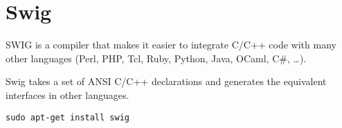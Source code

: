 \chapter{Swig}

SWIG is a compiler that makes it easier to integrate C/C++ code with
many other languages (Perl, PHP, Tcl, Ruby, Python, Java, OCaml, C\#, \ldots).

Swig takes a set of ANSI C/C++ declarations and generates the
equivalent interfaces in other languages. 

\begin{verbatim}
sudo apt-get install swig
\end{verbatim}
